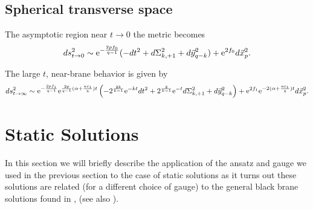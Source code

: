 \documentclass[a4paper,aps,nofootinbib,showpacs,preprint]{revtex4}
\begin{document}
\subsection{Spherical transverse space}
The asymptotic region near $t \to 0$ the metric becomes
\begin{equation}
ds^2_{t\to 0} \sim {\rm e}^{-\frac{2p f_0}{q-1}} ( - dt^2 +
d\Sigma_{k,+1}^2 + d\vec y_{q-k}^2 ) + {\rm e}^{2f_0} d\vec x_p^2.
\end{equation}

The large $t$, near-brane behavior is given by
\begin{equation}
ds^2_{t\to \infty} \sim {\rm e}^{-\frac{2pf_1}{q-1}} {\rm
e}^{\frac{2p}{q-1}(\alpha+\frac{ac_1}{\chi})t} \left( -
2^{\frac{2k}{k-1}} {\rm e}^{-kt} dt^2 + 2^{\frac2{k-1}} {\rm
e}^{-t} d\Sigma_{k,+1}^2 + d\vec y_{q-k}^2 \right) + {\rm
e}^{2f_1} {\rm e}^{-2(\alpha+\frac{ac_1}{\chi})t} d\vec x_p^2.
\end{equation}


\section{Static Solutions}
In this section we will  briefly describe the application of the
ansatz and gauge we used in the previous section to the case of
static solutions as it turns out these solutions are related (for
a different choice of gauge) to the general black brane
\cite{HoSt91} solutions found in \cite{ZZ99}, (see also
\cite{BMO01,GQZT01}).
\end{document}
